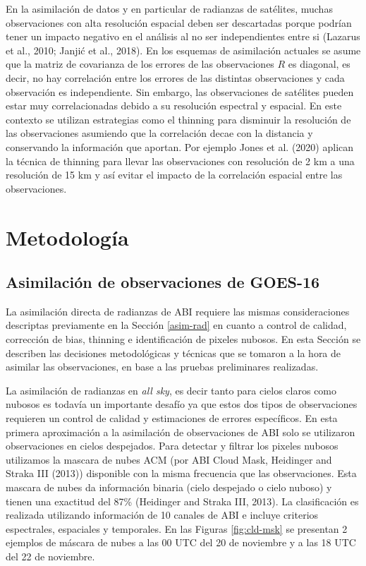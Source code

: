 \documentclass[12pt,oneside,a4paper]{reedthesis}
\begin{document}
En la asimilación de datos y en particular de radianzas de satélites, muchas observaciones con alta resolución espacial deben ser descartadas porque podrían tener un impacto negativo en el análisis al no ser independientes entre si (Lazarus et al., 2010; Janjić et al., 2018). En los esquemas de asimilación actuales se asume que la matriz de covarianza de los errores de las observaciones \(R\) es diagonal, es decir, no hay correlación entre los errores de las distintas observaciones y cada observación es independiente. Sin embargo, las observaciones de satélites pueden estar muy correlacionadas debido a su resolución espectral y espacial. En este contexto se utilizan estrategias como el thinning para disminuir la resolución de las observaciones asumiendo que la correlación decae con la distancia y conservando la información que aportan. Por ejemplo Jones et al. (2020) aplican la técnica de thinning para llevar las observaciones con resolución de 2 km a una resolución de 15 km y así evitar el impacto de la correlación espacial entre las observaciones.

\hypertarget{metodologuxeda-2}{%
\section{Metodología}\label{metodologuxeda-2}}

\hypertarget{asim-abi}{%
\subsection{Asimilación de observaciones de GOES-16}\label{asim-abi}}

La asimilación directa de radianzas de ABI requiere las mismas consideraciones descriptas previamente en la Sección \ref{asim-rad} en cuanto a control de calidad, corrección de bias, thinning e identificación de pixeles nubosos. En esta Sección se describen las decisiones metodológicas y técnicas que se tomaron a la hora de asimilar las observaciones, en base a las pruebas preliminares realizadas.

La asimilación de radianzas en \emph{all sky}, es decir tanto para cielos claros como nubosos es todavía un importante desafío ya que estos dos tipos de observaciones requieren un control de calidad y estimaciones de errores específicos. En esta primera aproximación a la asimilación de observaciones de ABI solo se utilizaron observaciones en cielos despejados. Para detectar y filtrar los pixeles nubosos utilizamos la mascara de nubes ACM (por ABI Cloud Mask, Heidinger and Straka III (2013)) disponible con la misma frecuencia que las observaciones. Esta mascara de nubes da información binaria (cielo despejado o cielo nuboso) y tienen una exactitud del 87\% (Heidinger and Straka III, 2013). La clasificación es realizada utilizando información de 10 canales de ABI e incluye criterios espectrales, espaciales y temporales. En las Figuras \ref{fig:cld-msk} se presentan 2 ejemplos de máscara de nubes a las 00 UTC del 20 de noviembre y a las 18 UTC del 22 de noviembre.
\end{document}
